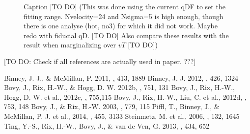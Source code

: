 \documentclass[12pt,preprint]{aastex}
\begin{document}

\begin{figure}
\caption{Caption [TO DO] (This was done using the current qDF to set the fitting range. Nvelocity=24 and Nsigma=5 is high enough, though there is one analyse (hot, no3) for which it did not work. Maybe redo with fiducial qD. [TO DO] Also compare these results with the result when marginalizing over $vT$ [TO DO])} 
\end{figure}



[TO DO: Check if all references are actually used in paper. ???]

\begin{thebibliography}{}
 Binney, J. J., \& McMillan, P. 2011, \mnras, 413, 1889
 Binney, J. J. 2012, \mnras, 426, 1324
 Bovy, J., Rix, H.-W., \& Hogg, D. W. 2012b, \apj, 751, 131
 Bovy, J., Rix, H.-W., Hogg, D. W. et al., 2012c, \apj, 755,115
 Bovy, J., Rix, H.-W., Liu, C. et al., 2012d, \apj, 753, 148
  Bovy, J., \& Rix, H.-W. 2003, \apj, 779, 115
 Piffl, T., Binney, J., \& McMillan, P. J. et al., 2014, \mnras, 455, 3133
 Steinmetz, M. et al., 2006, \aj, 132, 1645
 Ting, Y.-S., Rix, H.-W., Bovy, J., \& van de Ven, G. 2013, \mnras, 434, 652
\end{thebibliography}
\end{document}
